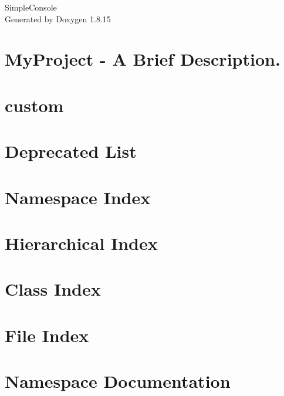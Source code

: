 \let\mypdfximage\pdfximage\def\pdfximage{\immediate\mypdfximage}\documentclass[twoside]{book}
\newcommand{\+}{\discretionary{\mbox{\scriptsize$\hookleftarrow$}}{}{}}
\newcommand{\clearemptydoublepage}{%
  \newpage{\pagestyle{empty}\cleardoublepage}%
}
\begin{document}
\hypersetup{pageanchor=false,
             bookmarksnumbered=true,
             pdfencoding=unicode
            }
\begin{titlepage}
\vspace*{7cm}
\begin{center}%
{\Large Simple\+Console }\\
\vspace*{1cm}
{\large Generated by Doxygen 1.8.15}\\
\end{center}
\end{titlepage}
\clearemptydoublepage
{}
\tableofcontents
\clearemptydoublepage
{}
\hypersetup{pageanchor=true}

\chapter{My\+Project -\/ A Brief Description.}
\label{index}\hypertarget{index}{}
\chapter{custom}
\label{md_pages_custom}

\chapter{Deprecated List}
\label{deprecated}

\chapter{Namespace Index}

\chapter{Hierarchical Index}

\chapter{Class Index}

\chapter{File Index}

\chapter{Namespace Documentation}





\end{document}
